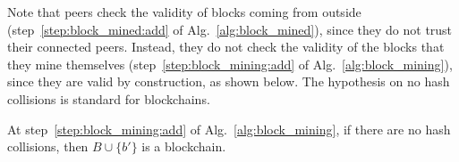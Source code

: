 Note that peers check the validity of blocks coming from outside
(step~\ref{step:block_mined:add} of Alg.~\ref{alg:block_mined}), since they do not trust
their connected peers. Instead, they do not check the validity of the blocks that they
mine themselves (step~\ref{step:block_mining:add} of Alg.~\ref{alg:block_mining}),
since they are valid by construction, as shown below. The hypothesis on no hash collisions
is standard for blockchains.
%
\begin{proposition}\label{prop:mining_is_sound}
  At step~\ref{step:block_mining:add} of Alg.~\ref{alg:block_mining},
  if there are no hash collisions, then $B\cup\{b'\}$ is a blockchain.
\end{proposition}
